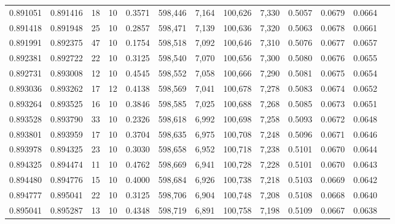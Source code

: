 \begin{tabular}{rrrrrrrrrrrrr}
0.891051 & 0.891416 &    18 &  10 &                                     0.3571 & 598,446 &   7,164 & 100,626 &   7,330 & 0.5057 & 0.0679 & 0.0664 \\
0.891418 & 0.891948 &    25 &  10 &                                     0.2857 & 598,471 &   7,139 & 100,636 &   7,320 & 0.5063 & 0.0678 & 0.0661 \\
0.891991 & 0.892375 &    47 &  10 &                                     0.1754 & 598,518 &   7,092 & 100,646 &   7,310 & 0.5076 & 0.0677 & 0.0657 \\
0.892381 & 0.892722 &    22 &  10 &                                     0.3125 & 598,540 &   7,070 & 100,656 &   7,300 & 0.5080 & 0.0676 & 0.0655 \\
0.892731 & 0.893008 &    12 &  10 &                                     0.4545 & 598,552 &   7,058 & 100,666 &   7,290 & 0.5081 & 0.0675 & 0.0654 \\
0.893036 & 0.893262 &    17 &  12 &                                     0.4138 & 598,569 &   7,041 & 100,678 &   7,278 & 0.5083 & 0.0674 & 0.0652 \\
0.893264 & 0.893525 &    16 &  10 &                                     0.3846 & 598,585 &   7,025 & 100,688 &   7,268 & 0.5085 & 0.0673 & 0.0651 \\
0.893528 & 0.893790 &    33 &  10 &                                     0.2326 & 598,618 &   6,992 & 100,698 &   7,258 & 0.5093 & 0.0672 & 0.0648 \\
0.893801 & 0.893959 &    17 &  10 &                                     0.3704 & 598,635 &   6,975 & 100,708 &   7,248 & 0.5096 & 0.0671 & 0.0646 \\
0.893978 & 0.894325 &    23 &  10 &                                     0.3030 & 598,658 &   6,952 & 100,718 &   7,238 & 0.5101 & 0.0670 & 0.0644 \\
0.894325 & 0.894474 &    11 &  10 &                                     0.4762 & 598,669 &   6,941 & 100,728 &   7,228 & 0.5101 & 0.0670 & 0.0643 \\
0.894480 & 0.894776 &    15 &  10 &                                     0.4000 & 598,684 &   6,926 & 100,738 &   7,218 & 0.5103 & 0.0669 & 0.0642 \\
0.894777 & 0.895041 &    22 &  10 &                                     0.3125 & 598,706 &   6,904 & 100,748 &   7,208 & 0.5108 & 0.0668 & 0.0640 \\
0.895041 & 0.895287 &    13 &  10 &                                     0.4348 & 598,719 &   6,891 & 100,758 &   7,198 & 0.5109 & 0.0667 & 0.0638 \\

\end{tabular}
